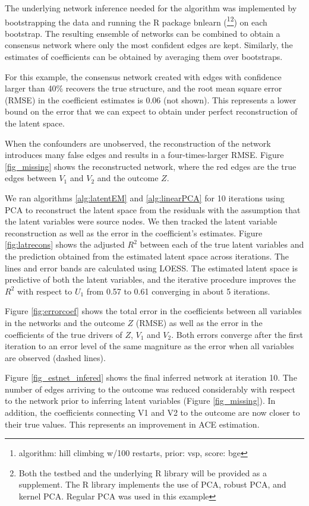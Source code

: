 \documentclass{article}
\begin{document}
The underlying network inference needed for the algorithm was
implemented by bootstrapping the data  and running
the R package bnlearn (\cite{scutari_learning_2010}\footnote{algorithm: hill climbing w/100 restarts, prior: vsp, score: bge}\footnote{Both the testbed and the underlying R library will be provided as a supplement.  The R library implements the use of PCA, robust PCA, and kernel PCA.  Regular PCA was used in this example}) on each bootstrap.  The resulting ensemble of networks can be combined to obtain a consensus network where only the most confident edges are kept. Similarly, the estimates of coefficients can be obtained by averaging them over bootstraps.

For this example, the consensus network created with edges with confidence larger than 40\%
recovers the true structure, and the root mean square error (RMSE) in the
coefficient estimates is 0.06 (not shown). This represents a lower
bound on the error that we can expect to obtain under perfect
reconstruction of the latent space.

When the confounders are unobserved, the reconstruction of the network
introduces many false edges and results in a four-times-larger RMSE. Figure \ref{fig_missing} shows the reconstructed network, where the red edges are the true edges between $V_1$ and $V_2$
and the outcome $Z$.

We ran algorithms \ref{alg:latentEM} and \ref{alg:linearPCA} for 10
iterations using PCA to reconstruct the latent space from the
residuals with the assumption that the latent variables were source nodes. We then tracked the latent variable reconstruction as well as the error in the coefficient's estimates. Figure \ref{fig:latrecons} shows the adjusted $R^2$ between each of the true latent variables and the prediction obtained
from the estimated latent space across iterations. The lines and error bands are calculated using LOESS. The estimated latent space is predictive of both
the latent variables, and the iterative procedure improves the $R^2$ with
respect to $U_1$ from 0.57 to 0.61 converging in about 5 iterations.

Figure \ref{fig:errorcoef} shows the total error in the coefficients
between all variables in the networks and the outcome $Z$ (RMSE) as
well as the error in the coefficients of the true drivers of $Z$, $V_1$
and $V_2$. Both errors converge after the first iteration to an error
level of the same magniture as the error when all variables are
observed (dashed lines).


Figure \ref{fig_estnet_infered} shows the final inferred network at iteration 10. The number of edges arriving to the outcome was reduced considerably with respect to the network prior to inferring latent variables (Figure \ref{fig_missing}). In addition, the coefficients connecting V1 and V2 to the outcome are now closer to their true values. This represents an improvement in ACE estimation.
\end{document}
